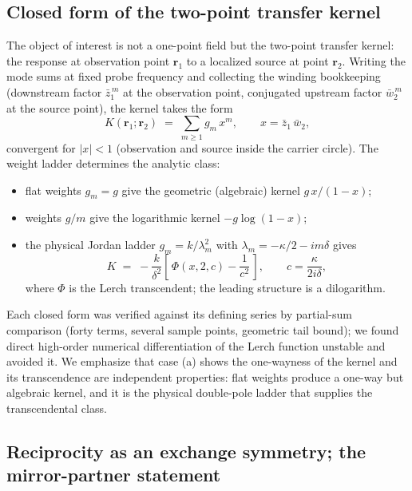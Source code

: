 \documentclass[11pt,a4paper]{article}
\newcommand{\zbone}{\bar{z}_1}
\newcommand{\wbtwo}{\bar{w}_2}
\begin{document}
\subsection{Closed form of the two-point transfer kernel}
\label{sec:closedform}

The object of interest is not a one-point field but the two-point transfer
kernel: the response at observation point $\mathbf{r}_1$ to a localized source at
point $\mathbf{r}_2$. Writing the mode sums at fixed probe frequency and
collecting the winding bookkeeping (downstream factor $\zbone^{\,m}$ at the
observation point, conjugated upstream factor $\wbtwo^{\,m}$ at the source
point), the kernel takes the form
\begin{equation}
K(\mathbf{r}_1;\mathbf{r}_2) \;=\; \sum_{m \geq 1} g_m\, x^m,
\qquad x = \zbone\,\wbtwo,
\label{eq:kernelsum}
\end{equation}
convergent for $|x| < 1$ (observation and source inside the carrier circle). The
weight ladder determines the analytic class:
\begin{itemize}
\item[(a)] flat weights $g_m = g$ give the geometric (algebraic) kernel
  $g\,x/(1 - x)$;
\item[(b)] weights $g/m$ give the logarithmic kernel $-g \log(1 - x)$;
\item[(c)] the physical Jordan ladder $g_m = k / \lambda_m^2$ with
  $\lambda_m = -\kappa/2 - i m \delta$ gives
  \begin{equation}
  K \;=\; -\frac{k}{\delta^{2}} \left[\, \Phi(x, 2, c) - \frac{1}{c^{2}} \,\right],
  \qquad c = \frac{\kappa}{2 i \delta},
  \label{eq:lerch}
  \end{equation}
  where $\Phi$ is the Lerch transcendent; the leading structure is a
  dilogarithm.
\end{itemize}
Each closed form was verified against its defining series by partial-sum
comparison (forty terms, several sample points, geometric tail bound); we found
direct high-order numerical differentiation of the Lerch function unstable and
avoided it. We emphasize that case (a) shows the one-wayness of the kernel and
its transcendence are independent properties: flat weights produce a one-way
but algebraic kernel, and it is the physical double-pole ladder that supplies
the transcendental class.

\subsection{Reciprocity as an exchange symmetry; the mirror-partner statement}
\label{sec:mirror}
\end{document}
